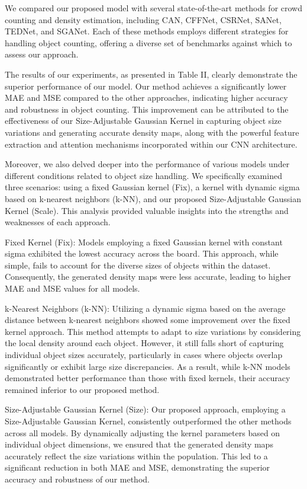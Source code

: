 \documentclass[journal]{IEEEtran}
\begin{document}
We compared our proposed model with several state-of-the-art methods for crowd counting and density estimation, including CAN, CFFNet, CSRNet, SANet, TEDNet, and SGANet. Each of these methods employs different strategies for handling object counting, offering a diverse set of benchmarks against which to assess our approach.

The results of our experiments, as presented in Table II, clearly demonstrate the superior performance of our model. Our method achieves a significantly lower MAE and MSE compared to the other approaches, indicating higher accuracy and robustness in object counting. This improvement can be attributed to the effectiveness of our Size-Adjustable Gaussian Kernel in capturing object size variations and generating accurate density maps, along with the powerful feature extraction and attention mechanisms incorporated within our CNN architecture.

Moreover, we also delved deeper into the performance of various models under different conditions related to object size handling. We specifically examined three scenarios: using a fixed Gaussian kernel (Fix), a kernel with dynamic sigma based on k-nearest neighbors (k-NN), and our proposed Size-Adjustable Gaussian Kernel (Scale). This analysis provided valuable insights into the strengths and weaknesses of each approach.

Fixed Kernel (Fix): Models employing a fixed Gaussian kernel with constant sigma exhibited the lowest accuracy across the board. This approach, while simple, fails to account for the diverse sizes of objects within the dataset. Consequently, the generated density maps were less accurate, leading to higher MAE and MSE values for all models.

k-Nearest Neighbors (k-NN): Utilizing a dynamic sigma based on the average distance between k-nearest neighbors showed some improvement over the fixed kernel approach. This method attempts to adapt to size variations by considering the local density around each object. However, it still falls short of capturing individual object sizes accurately, particularly in cases where objects overlap significantly or exhibit large size discrepancies. As a result, while k-NN models demonstrated better performance than those with fixed kernels, their accuracy remained inferior to our proposed method.

Size-Adjustable Gaussian Kernel (Size): Our proposed approach, employing a Size-Adjustable Gaussian Kernel, consistently outperformed the other methods across all models. By dynamically adjusting the kernel parameters based on individual object dimensions, we ensured that the generated density maps accurately reflect the size variations within the population. This led to a significant reduction in both MAE and MSE, demonstrating the superior accuracy and robustness of our method.
\end{document}
